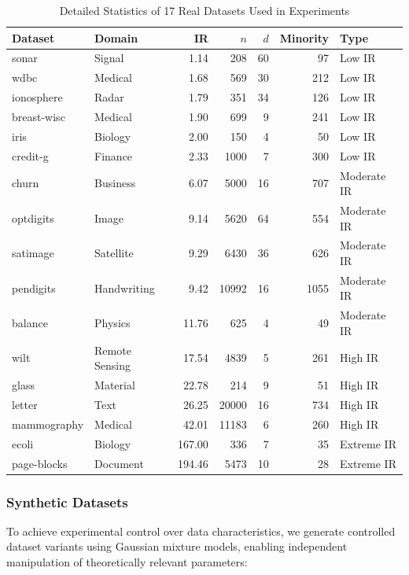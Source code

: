 \documentclass[12pt,a4paper]{article}
\theoremstyle{definition}
\begin{document}
\begin{table}[!ht]
 \centering
 \caption{Detailed Statistics of 17 Real Datasets Used in Experiments}
 \label{tab:datasets}
 \small
 \begin{tabular}{llrrrrl}
 \toprule
 \textbf{Dataset} & \textbf{Domain} & \textbf{IR} & \textbf{$n$} & \textbf{$d$} & \textbf{Minority} & \textbf{Type} \\
 \midrule
 sonar & Signal & 1.14 & 208 & 60 & 97 & Low IR \\
 wdbc & Medical & 1.68 & 569 & 30 & 212 & Low IR \\
 ionosphere & Radar & 1.79 & 351 & 34 & 126 & Low IR \\
 breast-wisc & Medical & 1.90 & 699 & 9 & 241 & Low IR \\
 iris & Biology & 2.00 & 150 & 4 & 50 & Low IR \\
 credit-g & Finance & 2.33 & 1000 & 7 & 300 & Low IR \\
 \midrule
 churn & Business & 6.07 & 5000 & 16 & 707 & Moderate IR \\
 optdigits & Image & 9.14 & 5620 & 64 & 554 & Moderate IR \\
 satimage & Satellite & 9.29 & 6430 & 36 & 626 & Moderate IR \\
 pendigits & Handwriting & 9.42 & 10992 & 16 & 1055 & Moderate IR \\
 balance & Physics & 11.76 & 625 & 4 & 49 & Moderate IR \\
 \midrule
 wilt & Remote Sensing & 17.54 & 4839 & 5 & 261 & High IR \\
 glass & Material & 22.78 & 214 & 9 & 51 & High IR \\
 letter & Text & 26.25 & 20000 & 16 & 734 & High IR \\
 mammography & Medical & 42.01 & 11183 & 6 & 260 & High IR \\
 \midrule
 ecoli & Biology & 167.00 & 336 & 7 & 35 & Extreme IR \\
 page-blocks & Document & 194.46 & 5473 & 10 & 28 & Extreme IR \\
 \bottomrule
 \end{tabular}
\end{table}

\subsubsection{Synthetic Datasets}
To achieve experimental control over data characteristics, we generate controlled dataset variants using Gaussian mixture models, enabling independent manipulation of theoretically relevant parameters:
\end{document}
